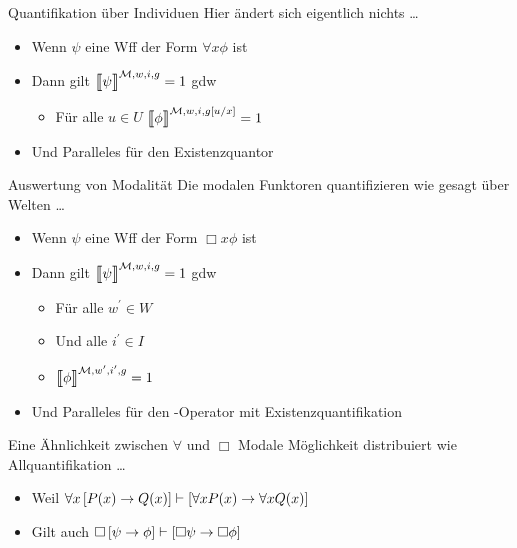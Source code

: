 \begin{frame}
  {Quantifikation über Individuen}
  \onslide<+->
  \onslide<+->
  Hier ändert sich eigentlich nichts \ldots\\
  \Halbzeile
  \begin{itemize}[<+->]
    \item Wenn \alert{$\psi$} eine Wff der Form \alert{$\forall x\phi$} ist
    \Viertelzeile
    \item Dann gilt \alert{$\DEMM{\psi}=1$} gdw
      \begin{itemize}[<+->]
        \item Für alle \alert{$u\in U$} \alert{$\Dem{\phi}{\mMm,w,i,g[u/x]}=1$}
      \end{itemize}
      \Viertelzeile
    \item Und Paralleles für den Existenzquantor
  \end{itemize}
\end{frame}

\begin{frame}
  {Auswertung von Modalität}
  \onslide<+->
  \onslide<+->
  Die modalen Funktoren quantifizieren wie gesagt über Welten \ldots\\
  \Halbzeile
  \onslide<+->
  \begin{itemize}[<+->]
    \item<1-> Wenn \alert{$\psi$} eine Wff der Form \alert{$\Box x\phi$} ist
      \Viertelzeile
    \item Dann gilt \alert{$\DEMM{\psi}=1$} gdw
      \begin{itemize}[<+->]
        \item Für alle \alert{$w^{\prime}\in W$}
        \item Und alle \alert{$i^{\prime}\in I$}
        \item \alert{$\Dem{\phi}{\mMm,w^{\prime},i^{\prime},g}=1$}
      \end{itemize}
      \Viertelzeile
    \item Und Paralleles für den \blau{$\Diamond$}-Operator mit Existenzquantifikation
  \end{itemize}
\end{frame}


\begin{frame}
  {Eine Ähnlichkeit zwischen $\forall$ und $\Box$}
  \onslide<+->
  \onslide<+->
  \alert{Modale Möglichkeit} distribuiert wie Allquantifikation \ldots\\
  \Halbzeile
  \begin{itemize}[<+->]
    \item Weil \alert{$\forall x\left[{}P(x)\rightarrow Q(x)\right]\vdash\left[{}\forall xP(x) \rightarrow \forall x Q(x)\right]$}\\
    \item Gilt auch \alert{$\Box\left[{}\psi\rightarrow\phi\right]\vdash\left[{}\Box \psi\rightarrow\Box\phi\right]$}\\
  \end{itemize}
\end{frame}

